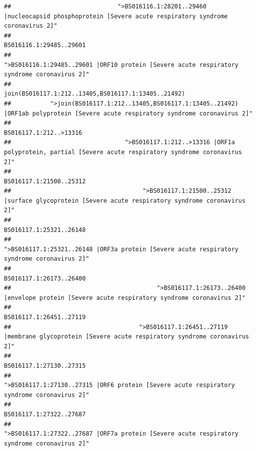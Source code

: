 \documentclass[
]{article}
\begin{document}
\begin{verbatim}
##                              ">BS016116.1:28201..29460 |nucleocapsid phosphoprotein [Severe acute respiratory syndrome coronavirus 2]" 
##                                                                                                                BS016116.1:29485..29601 
##                                            ">BS016116.1:29485..29601 |ORF10 protein [Severe acute respiratory syndrome coronavirus 2]" 
##                                                                                    join(BS016117.1:212..13405,BS016117.1:13405..21492) 
##           ">join(BS016117.1:212..13405,BS016117.1:13405..21492) |ORF1ab polyprotein [Severe acute respiratory syndrome coronavirus 2]" 
##                                                                                                                 BS016117.1:212..>13316 
##                                ">BS016117.1:212..>13316 |ORF1a polyprotein, partial [Severe acute respiratory syndrome coronavirus 2]" 
##                                                                                                                BS016117.1:21500..25312 
##                                     ">BS016117.1:21500..25312 |surface glycoprotein [Severe acute respiratory syndrome coronavirus 2]" 
##                                                                                                                BS016117.1:25321..26148 
##                                            ">BS016117.1:25321..26148 |ORF3a protein [Severe acute respiratory syndrome coronavirus 2]" 
##                                                                                                                BS016117.1:26173..26400 
##                                         ">BS016117.1:26173..26400 |envelope protein [Severe acute respiratory syndrome coronavirus 2]" 
##                                                                                                                BS016117.1:26451..27119 
##                                    ">BS016117.1:26451..27119 |membrane glycoprotein [Severe acute respiratory syndrome coronavirus 2]" 
##                                                                                                                BS016117.1:27130..27315 
##                                             ">BS016117.1:27130..27315 |ORF6 protein [Severe acute respiratory syndrome coronavirus 2]" 
##                                                                                                                BS016117.1:27322..27687 
##                                            ">BS016117.1:27322..27687 |ORF7a protein [Severe acute respiratory syndrome coronavirus 2]" 

\end{verbatim}
\end{document}
